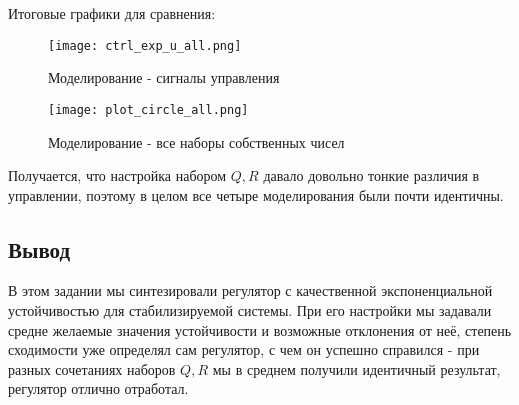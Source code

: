 \newpage
Итоговые графики для сравнения:

\begin{figure}[ht]
  \centering
  \texttt{[image: ctrl\_exp\_u\_all.png]}
  \caption{Моделирование - сигналы управления}
\end{figure}
\begin{figure}[ht]
  \centering
  \texttt{[image: plot\_circle\_all.png]}
  \caption{Моделирование - все наборы собственных чисел}
\end{figure}
Получается, что настройка набором $Q, R$ давало довольно тонкие различия в управлении, поэтому в целом все четыре моделирования были почти идентичны.
\subsection{Вывод}
В этом задании мы синтезировали регулятор с качественной экспоненциальной устойчивостью для стабилизируемой системы.
При его настройки мы задавали средне желаемые значения устойчивости и возможные отклонения от неё, 
степень сходимости уже определял сам регулятор, с чем он успешно справился - при разных сочетаниях наборов $Q, R$ мы в среднем получили идентичный результат, регулятор отлично отработал.

\endinput